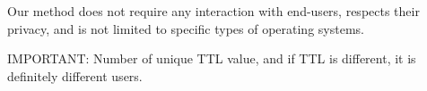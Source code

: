



Our method does not require any interaction with end-users, respects their privacy, and is not limited to specific types of operating systems.

IMPORTANT: Number of unique TTL value, and if TTL is different, it is definitely different users.